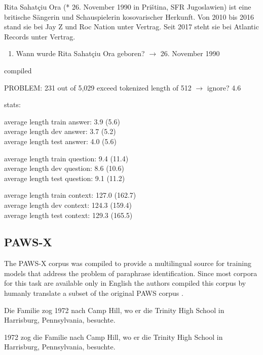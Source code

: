 \begin{examples}
	\label{ex:mlqa}
	\item Rita Sahatçiu Ora (* 26. November 1990 in Priština, SFR Jugoslawien) ist eine britische Sängerin und Schauspielerin kosovarischer Herkunft. Von 2010 bis 2016 stand sie bei Jay Z und Roc Nation unter Vertrag. Seit 2017 steht sie bei Atlantic Records unter Vertrag.
\end{examples}

\begin{enumerate}
	\item Wann wurde Rita Sahatçiu Ora geboren? $\rightarrow$ 26. November 1990
\end{enumerate}

\cite{lewis2019mlqa} compiled

PROBLEM: 231 out of 5,029 exceed tokenized length of 512 $\rightarrow$ ignore? 4.6%

stats:

average length train answer: 3.9 (5.6) \\
average length dev answer: 3.7 (5.2) \\
average length test answer: 4.0 (5.6)

average length train question: 9.4 (11.4) \\
average length dev question: 8.6 (10.6) \\
average length test question: 9.1 (11.2)

average length train context: 127.0 (162.7) \\
average length dev context: 124.3 (159.4) \\
average length test context: 129.3 (165.5)


\subsection{PAWS-X}

The PAWS-X corpus \cite{yang2019paws} was compiled to provide a multilingual source for training models that address the problem of paraphrase identification. 
Since most corpora for this task are available only in English the authors compiled this corpus by humanly translate a subset of the original PAWS corpus \cite{zhang2019paws}.

\begin{examples}
	\label{ex:paws-x}
	\item Die Familie zog 1972 nach Camp Hill, wo er die Trinity High School in Harrisburg, Pennsylvania, besuchte.
		
	1972 zog die Familie nach Camp Hill, wo er die Trinity High School in Harrisburg, Pennsylvania, besuchte.
\end{examples}

